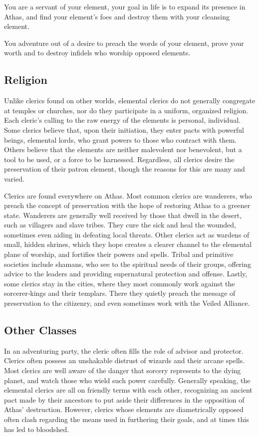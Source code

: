 You are a servant of your element, your goal in life is to expand its presence in Athas, and find your element's foes and destroy them with your cleansing element.

You adventure out of a desire to preach the words of your element, prove your worth and to destroy infidels who worship opposed elements.

\subsection{Religion}

Unlike clerics found on other worlds, elemental clerics do not generally congregate at temples or churches, nor do they participate in a uniform, organized religion. Each cleric's calling to the raw energy of the elements is personal, individual. Some clerics believe that, upon their initiation, they enter pacts with powerful beings, elemental lords, who grant powers to those who contract with them. Others believe that the elements are neither malevolent nor benevolent, but a tool to be used, or a force to be harnessed. Regardless, all clerics desire the preservation of their patron element, though the reasons for this are many and varied.

Clerics are found everywhere on Athas. Most common clerics are wanderers, who preach the concept of preservation with the hope of restoring Athas to a greener state. Wanderers are generally well received by those that dwell in the desert, such as villagers and slave tribes. They cure the sick and heal the wounded, sometimes even aiding in defeating local threats. Other clerics act as wardens of small, hidden shrines, which they hope creates a clearer channel to the elemental plane of worship, and fortifies their powers and spells. Tribal and primitive societies include shamans, who see to the spiritual needs of their groups, offering advice to the leaders and providing supernatural protection and offense. Lastly, some clerics stay in the cities, where they most commonly work against the sorcerer‐kings and their templars. There they quietly preach the message of preservation to the citizenry, and even sometimes work with the Veiled Alliance.

\subsection{Other Classes}

In an adventuring party, the cleric often fills the role of advisor and protector. Clerics often possess an unshakable distrust of wizards and their arcane spells. Most clerics are well aware of the danger that sorcery represents to the dying planet, and watch those who wield such power carefully. Generally speaking, the elemental clerics are all on friendly terms with each other, recognizing an ancient pact made by their ancestors to put aside their differences in the opposition of Athas' destruction. However, clerics whose elements are diametrically opposed often clash regarding the means used in furthering their goals, and at times this has led to bloodshed.

